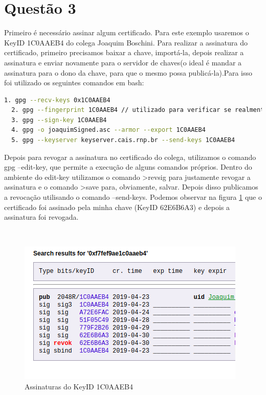 \documentclass[openany]{ufsctex/ufsctex}
\begin{document}
\section{Questão 3}

	Primeiro é necessário assinar algum certificado. Para este exemplo usaremos o KeyID 1C0AAEB4 do colega Joaquim Boschini. Para realizar a assinatura do certificado, primeiro precisamos baixar a chave, importá-la, depois realizar a assinatura e enviar novamente para o servidor de chaves(o ideal é mandar a assinatura para o dono da chave, para que o mesmo possa publicá-la).Para isso foi utilizado os seguintes comandos em bash:
	
\begin{lstlisting}[language=bash,breaklines=true, tabsize=2,basicstyle =\fontsize{9}{11}]
  1. gpg --recv-keys 0x1C0AAEB4
  2. gpg --fingerprint 1C0AAEB4 // utilizado para verificar se realmente eh o certificado que eu queria
  3. gpg --sign-key 1C0AAEB4
  4. gpg -o joaquimSigned.asc --armor --export 1C0AAEB4
  5. gpg --keyserver keyserver.cais.rnp.br --send-keys 1C0AAEB4
\end{lstlisting}

	Depois para revogar a assinatura no certificado do colega, utilizamos o comando gpg --edit-key, que permite a execução de alguns comandos próprios. Dentro do ambiente do edit-key utilizamos o comando >revsig para justamente revogar a assinatura e o comando >save para, obviamente, salvar. Depois disso publicamos a revocação utilisando o comando --send-keys. Podemos observar na figura \ref{fig:a3} que o certificado foi assinado pela minha chave (KeyID 62E6B6A3) e depois a assinatura foi revogada.
	
	
\begin{figure}[!htb]
   \
   \caption{Assinaturas do KeyID 1C0AAEB4}\label{fig:a3}
   \includegraphics[scale=0.6]{images/questao3.png}
\end{figure}
\end{document}
